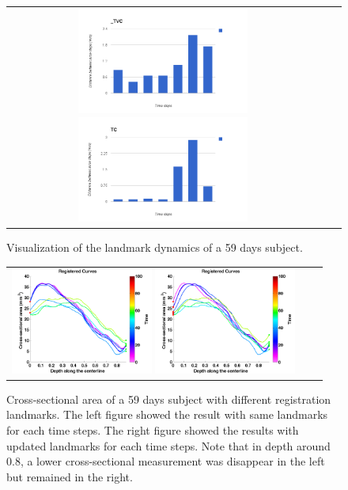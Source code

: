 \begin{figure}[tb]
  \begin{center}
    \begin{tabular}{ccc}
    \includegraphics[height=35mm] {fig/d_TVC.png}
    \includegraphics[height=35mm] {fig/dTC.png}
    \end{tabular}
    \caption{ \label{fig:landmark_dynamics} Visualization of the landmark dynamics of a 59 days subject. 
    }
  \end{center}
\end{figure}

\begin{figure}[tb]
  \begin{center}
    \begin{tabular}{ccc}
    \includegraphics[height=35mm] {fig/registered_1_updates_0.png}
    \includegraphics[height=35mm] {fig/registered_1_updates_1.png}
    \end{tabular}
    \caption{ \label{fig:landmark_updated} Cross-sectional area of a 59 days subject with different registration landmarks. The left figure showed the result with same landmarks for each time steps. The right figure showed the results with updated landmarks for each time steps. Note that in depth around 0.8, a lower cross-sectional measurement was disappear in the left but remained in the right.
    }
  \end{center}
\end{figure}

